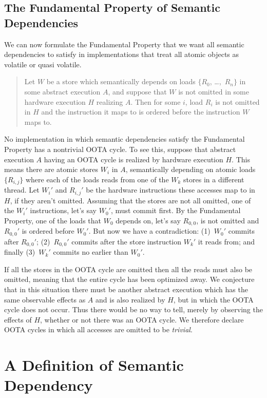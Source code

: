 \subsection{The Fundamental Property of Semantic Dependencies}
\label{sec:The Fundamental Property of Semantic Dependencies}

We can now formulate the Fundamental Property that we want all semantic
dependencies to satisfy in implementations that treat all atomic objects
as volatile or quasi volatile.
\begin{quote}
Let $W$ be a store which semantically depends on loads
$\{R_0$, \ldots,~$R_n\}$ in some abstract execution $A$,
and suppose that $W$ is not
omitted in some hardware execution $H$ realizing $A$.
Then for some $i$, load $R_i$ is not omitted in $H$ and the
instruction it maps to is ordered before the instruction $W$ maps to.
\end{quote}

No implementation in which semantic dependencies satisfy the Fundamental
Property has a nontrivial OOTA cycle.
To see this, suppose that abstract execution $A$ having an OOTA cycle
is realized by hardware execution $H$.
This means there are atomic stores $W_i$ in $A$,
semantically depending on atomic loads
$\{R_{i,j}\}$ where each of the loads reads from one of the $W_k$
stores in a different thread.
Let $W_i'$ and $R_{i,j}'$ be the hardware instructions these accesses
map to in $H$, if they aren't omitted.
Assuming that the stores are not all omitted,
one of the $W_i'$ instructions, let's say $W_0'$, must commit first.
By the Fundamental Property, one of the loads that $W_0$ depends on,
let's say $R_{0,0}$, is not omitted and $R_{0,0}'$ is ordered before $W_0'$.
But now we have a contradiction:
(1)~$W_0'$ commits after $R_{0,0}'$;
(2)~$R_{0,0}'$ commits after the store instruction $W_k'$ it reads from;
and finally
(3)~$W_k'$ commits no earlier than $W_0'$.

If all the stores in the OOTA cycle are omitted then all the reads must
also be omitted, meaning that the entire cycle has been optimized away.
We conjecture that in this situation there must be another abstract
execution which has the same observable effects as $A$ and is also
realized by $H$, but in which the OOTA cycle does not occur.
Thus there would be no way to tell, merely by observing the effects of
$H$, whether or not there was an OOTA cycle.
We therefore declare OOTA cycles in which all accesses are omitted to
be \emph{trivial}.

\section{A Definition of Semantic Dependency}
\label{sec:A Definition of Semantic Dependency}

